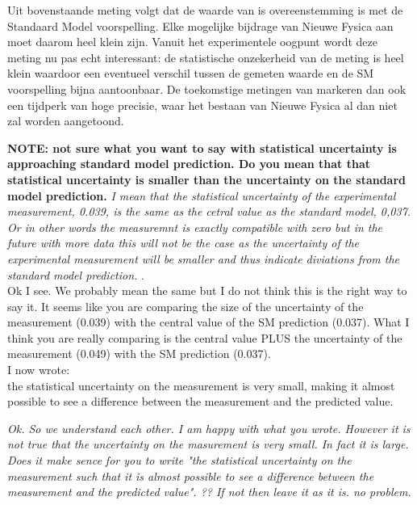 \noindent Uit bovenstaande meting volgt dat de waarde van \phis is overeenstemming is met de Standaard Model voorspelling. Elke mogelijke bijdrage van Nieuwe Fysica aan \phis moet daarom heel klein zijn. Vanuit het experimentele oogpunt wordt deze meting nu pas echt interessant: de statistische onzekerheid van de meting is heel klein waardoor een eventueel verschil tussen de gemeten waarde en de SM voorspelling bijna aantoonbaar. De toekomstige metingen van \phis markeren dan ook een tijdperk van hoge precisie, waar het bestaan van Nieuwe Fysica al dan niet zal worden aangetoond.

\textbf{NOTE: not sure what you want to say with statistical uncertainty is approaching standard model prediction.
 Do you mean that that statistical uncertainty is smaller than the uncertainty on the standard model prediction.}
{\color{green}\it I mean that the statistical uncertainty of the experimental measurement, 0.039, is the
same as the cetral value as the standard model, 0,037. Or in other words the measuremnt is exactly compatible
with zero but in the future with more data this will not be the case as the uncertainty of the experimental
measurement will be smaller and thus indicate diviations from the standard model prediction. }.\\
{\color{red} Ok I see. We probably mean the same but I do not think this is the right way to say it.
It seems like you are comparing the size of the uncertainty of the measurement (0.039) with the central
value of the SM prediction (0.037). What I think you are really comparing is the central value PLUS the
uncertainty of the measurement (0.049) with the SM prediction (0.037). \\
I now wrote:\\
the statistical uncertainty on the measurement is very small, making it almost possible to see a difference
between the measurement and the predicted value.}

{\color{green}\it Ok. So we understand each other. I am happy with what you wrote. However it is not true that
the uncertainty on the masurement is very small. In fact it is large. Does it make sence for you to write
 "the statistical uncertainty on the measurement such that it is almost possible to see a difference
between the measurement and the predicted value". ?? If not then leave it as it is. no problem.}\\


